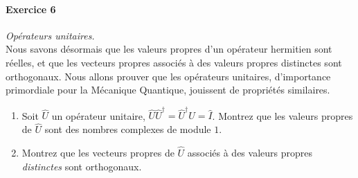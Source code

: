 \paragraph{Exercice 6} \textit{Opérateurs unitaires.} \\
Nous savons désormais que les valeurs propres d'un opérateur hermitien sont réelles, et que les vecteurs propres associés à des valeurs propres distinctes sont orthogonaux. Nous allons prouver que les opérateurs unitaires, d'importance primordiale pour la Mécanique Quantique, jouissent de propriétés similaires.
\begin{enumerate}
\item Soit $\hat U$ un opérateur unitaire, $\hat U \hat U^\dagger = \hat U^\dagger \hat U = \hat I$. Montrez que les valeurs propres de $\hat U$ sont des nombres complexes de module $1$. 
\item Montrez que les vecteurs propres de $\hat U$ associés à des valeurs propres \textit{distinctes} sont orthogonaux. 
\end{enumerate}

